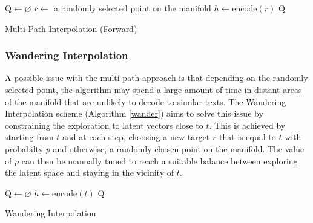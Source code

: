 \documentclass[12pt,a4paper]{article}
\begin{document}
\vspace{-1mm}
 \begin{algorithm}[H]
    \SetAlgoLined
    $\mathrm{Q} \gets \varnothing$\;
    $r \gets$ a randomly selected point on the manifold\;
    $h \gets \mathrm{encode}(r)$\;
    \Return $\mathrm{Q}$\;   
    \caption{Multi-Path Interpolation (Forward)}
    \label{multipath}
\end{algorithm}

\subsubsection{Wandering Interpolation}
\noindent A possible issue with the multi-path approach is that depending on the randomly selected point, the algorithm may spend a large amount of time in distant areas of the manifold that are unlikely to decode to similar texts. The Wandering Interpolation scheme (Algorithm \ref{wander}) aims to solve this issue by constraining the exploration to latent vectors close to $t$. This is achieved by starting from $t$ and at each step, choosing a new target $r$ that is equal to $t$ with probabilty $p$ and otherwise, a randomly chosen point on the manifold. The value of $p$ can then be manually tuned to reach a suitable balance between exploring the latent space and staying in the vicinity of $t$.\\

\vspace{-1mm}
 \begin{algorithm}[H]
    \SetAlgoLined
    $\mathrm{Q} \gets \varnothing$\;
    $h \gets \mathrm{encode}(t)$\;
    \Return $\mathrm{Q}$\;   
    \caption{Wandering Interpolation}
    \label{wander}
\end{algorithm}
\end{document}
